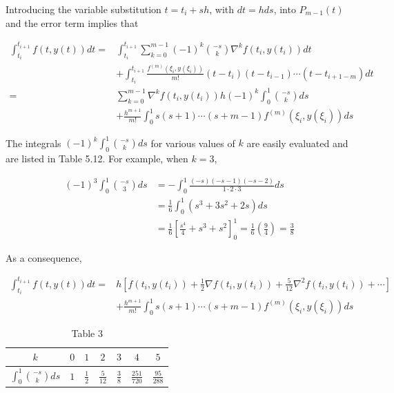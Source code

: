 Introducing the variable substitution $t=t_{i}+s h$, with $d t=h d s$, into $P_{m-1}(t)$ and the error term implies that

$$
\begin{aligned}
\int_{t_{i}}^{t_{i+1}} f(t, y(t)) d t= & \int_{t_{i}}^{t_{i+1}} \sum_{k=0}^{m-1}(-1)^{k}\binom{-s}{k} \nabla^{k} f\left(t_{i}, y\left(t_{i}\right)\right) d t \\
& +\int_{t_{i}}^{t_{i+1}} \frac{f^{(m)}\left(\xi_{i}, y\left(\xi_{i}\right)\right)}{m!}\left(t-t_{i}\right)\left(t-t_{i-1}\right) \cdots\left(t-t_{i+1-m}\right) d t \\
= & \sum_{k=0}^{m-1} \nabla^{k} f\left(t_{i}, y\left(t_{i}\right)\right) h(-1)^{k} \int_{0}^{1}\binom{-s}{k} d s \\
& +\frac{h^{m+1}}{m!} \int_{0}^{1} s(s+1) \cdots(s+m-1) f^{(m)}\left(\xi_{i}, y\left(\xi_{i}\right)\right) d s
\end{aligned}
$$

The integrals $(-1)^{k} \int_{0}^{1}\binom{-s}{k} d s$ for various values of $k$ are easily evaluated and are listed in Table 5.12. For example, when $k=3$,

$$
\begin{aligned}
(-1)^{3} \int_{0}^{1}\binom{-s}{3} d s & =-\int_{0}^{1} \frac{(-s)(-s-1)(-s-2)}{1 \cdot 2 \cdot 3} d s \\
& =\frac{1}{6} \int_{0}^{1}\left(s^{3}+3 s^{2}+2 s\right) d s \\
& =\frac{1}{6}\left[\frac{s^{4}}{4}+s^{3}+s^{2}\right]_{0}^{1}=\frac{1}{6}\left(\frac{9}{4}\right)=\frac{3}{8}
\end{aligned}
$$

As a consequence,

\begin{equation}\label{eqn:multistepeq9}
\begin{split}
\int_{t_{i}}^{t_{i+1}} f(t, y(t)) d t= & h\left[f\left(t_{i}, y\left(t_{i}\right)\right)+\frac{1}{2} \nabla f\left(t_{i}, y\left(t_{i}\right)\right)+\frac{5}{12} \nabla^{2} f\left(t_{i}, y\left(t_{i}\right)\right)+\cdots\right] \\
& +\frac{h^{m+1}}{m!} \int_{0}^{1} s(s+1) \cdots(s+m-1) f^{(m)}\left(\xi_{i}, y\left(\xi_{i}\right)\right) d s 
\end{split}
\end{equation}


\begin{table}[h]
\centering
\begin{tabular}{c|cccccc}
\hline
$k$&$0$&$1$&$2$&$3$&$4$&$5$\\\hline
$\int_{0}^{1}\binom{-s}{k} d s$&$1$&$\frac{1}{2}$&$\frac{5}{12}$&$\frac{3}{8}$&$\frac{251}{720}$&$\frac{95}{288}$\\
\hline
\end{tabular}
\caption{\scriptsize Table $3$}
\label{tab:multisteptab12}
\end{table}



